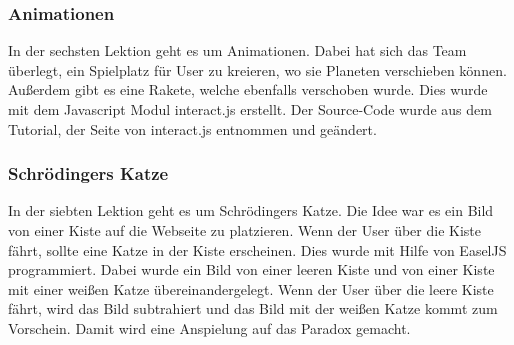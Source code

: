 \subsubsection{Animationen}
In der sechsten Lektion geht es um Animationen. Dabei hat sich das Team überlegt, ein Spielplatz für User zu kreieren, wo sie Planeten verschieben können. Außerdem gibt es eine Rakete, welche ebenfalls verschoben wurde. Dies wurde mit dem Javascript Modul interact.js erstellt. Der Source-Code wurde aus dem Tutorial, der Seite von interact.js entnommen und geändert. 

\subsubsection{Schrödingers Katze}
In der siebten Lektion geht es um Schrödingers Katze. Die Idee war es ein Bild von einer Kiste auf die Webseite zu platzieren. Wenn der User über die Kiste fährt, sollte eine Katze in der Kiste erscheinen. Dies wurde mit Hilfe von EaselJS programmiert. Dabei wurde ein Bild von einer leeren Kiste und von einer Kiste mit einer weißen Katze übereinandergelegt. Wenn der User über die leere Kiste fährt, wird das Bild subtrahiert und das Bild mit der weißen Katze kommt zum Vorschein. Damit wird eine Anspielung auf das Paradox gemacht. 
